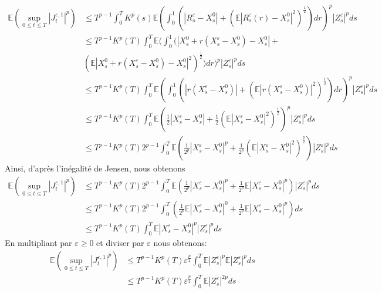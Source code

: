 \documentclass[12pt,a4paper,twoside,fleqn]{book}%
\theoremstyle{definition}
\theoremstyle{lemme}
\numberwithin{equation}{section}
\begin{document}
\[
\begin{aligned}
\mathbb{E}\left(\sup_{0\leq t \leq T}|J_t^{\varepsilon,1}|^p\right)&\leq T^{p-1}\int_{0}^{T}K^p(s)\mathbb{E}\left(\int_{0}^{1}\left(|R^\varepsilon_s-X_s^0| +\left(\mathbb{E}|R_s^\varepsilon(r)-X_s^0|^2\right)^{\frac{1}{2}}\right)dr\right)^p|Z_s^\varepsilon|^pds\\
&\leq T^{p-1}K^p(T)\int_{0}^{T}\mathbb{E}\Big(\int_{0}^{1}\Big(|X_s^0 + r(X_s^\varepsilon-X_s^0)-X_s^0| +\\& \left(\mathbb{E}|X_s^0+r(X_s^\varepsilon-X_s^0)-X_s^0|^2\right)^{\frac{1}{2}}\Big)dr\Big)^p|Z_s^\varepsilon|^pds\\
&\leq T^{p-1}K^p(T)\int_{0}^{T}\mathbb{E}\left(\int_{0}^{1}\left(|r(X_s^\varepsilon-X_s^0)| + \left(\mathbb{E}|r(X_s^\varepsilon-X_s^0)|^2\right)^{\frac{1}{2}}\right)dr\right)^p|Z_s^\varepsilon|^pds\\
&\leq T^{p-1}K^p(T)\int_{0}^{T}\mathbb{E}\left(\frac{1}{2}|X_s^\varepsilon-X_s^0|+\frac{1}{2}\left(\mathbb{E}|X_s^\varepsilon-X_s^0|^2\right)^{\frac{1}{2}}\right)^p|Z_s^\varepsilon|^pds\\
&\leq T^{p-1}K^p(T)2^{p-1}\int_{0}^{T}\mathbb{E}\left(\frac{1}{2^p}|X_s^\varepsilon-X_s^0|^p +\frac{1}{2^{p}}\left(\mathbb{E}|X_s^\varepsilon-X_s^0|^2\right)^{\frac{p}{2}}\right)|Z_s^\varepsilon|^pds
\end{aligned}
\]Ainsi, d'après l'inégalité de Jensen, nous obtenons
\[
\begin{aligned}
	\mathbb{E}\left(\sup_{0\leq t \leq T}|J_t^{\varepsilon,1}|^p\right)&\leq T^{p-1}K^p(T)2^{p-1}\int_{0}^{T}\mathbb{E}\left(\frac{1}{2^p}|X_s^\varepsilon-X_s^0|^p +\frac{1}{2^{p}}\mathbb{E}|X_s^\varepsilon-X_s^0|^p\right)|Z_s^\varepsilon|^pds\\
	&\leq T^{p-1}K^p(T)2^{p-1}\int_{0}^{T}\left(\frac{1}{2^p}\mathbb{E}|X_s^\varepsilon-X_s^0|^0+\frac{1}{2^p}\mathbb{E}|X_s^\varepsilon-X_s^0|^p\right)ds\\
	&\leq T^{p-1}K^p(T)\int_{0}^{T}\mathbb{E}|X_s^\varepsilon-X_s^0|^p|Z_s^\varepsilon|^pds
\end{aligned}
\]
En multipliant par $\varepsilon\geq0$ et diviser par $\varepsilon$ nous obtenons:
\begin{equation}\label{eq:2.2.34}
	\begin{aligned}
		\mathbb{E}\left(\sup_{0\leq t \leq T}|J_t^{\varepsilon,1}|^p\right)&\leq T^{p-1}K^p(T)\varepsilon^{\frac{p}{2}}\int_{0}^{T}\mathbb{E}|Z^\varepsilon_s|^p\mathbb{E}|Z_s^\varepsilon|^pds\\
		&\leq T^{p-1}K^p(T)\varepsilon^{\frac{p}{2}}\int_{0}^{T}\mathbb{E}|Z^\varepsilon_s|^{2p}ds
	\end{aligned}
\end{equation}
\end{document}
